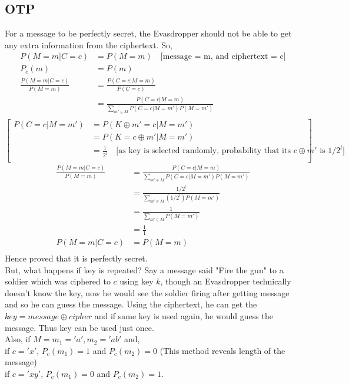 \documentclass[english, 11pt]{article}
\begin{document}
\subsection*{OTP}
For a message to be perfectly secret, the Evasdropper should not be able to get any extra information from the ciphertext. So, \\
\begin{align*}
  P(M=m|C=c) &= P(M=m) \quad \text{[message = m, and ciphertext = c]} \\
  P_c(m) &= P(m) \\
  \frac{P(M=m|C=c)}{P(M=m)} &= \frac{P(C=c|M=m)}{P(C=c)} \\
  &= \frac{P(C=c|M=m)}{\sum_{m' \in M} P(C=c|M=m')P(M=m')} \\
\end{align*}
\[
\left[
\begin{aligned}
  P(C=c|M=m') &= P(K \oplus m' = c | M = m') \\
  &= P(K = c \oplus m'  | M = m') \\
  &= \frac{1}{2^l} \quad \text{[as key is selected randomly, probability that its $c \oplus m'$ is $1/2^l$]} \\
\end{aligned}
\right]
\]
\begin{align*}
  \frac{P(M=m|C=c)}{P(M=m)} &= \frac{P(C=c|M=m)}{\sum_{m' \in M} P(C=c|M=m')P(M=m')} \\
  &= \frac{1/2^l}{\sum_{m' \in M} (1/2^l)P(M=m')} \\
  &= \frac{1}{\sum_{m' \in M} P(M=m')} \\
  &= \frac{1}{1} \\
  P(M=m|C=c) &= P(M=m) \\
\end{align*}
Hence proved that it is perfectly secret. \\
But, what happens if key is repeated? Say a message said "Fire the gun" to a soldier which was ciphered to $c$ using key $k$, though an Evasdropper technically doesn't know the key, now he would see the soldier firing after getting message and so he can guess the message.
Using the ciphertext, he can get the $key = message \oplus cipher$ and if same key is used again, he would guess the message. Thus key can be used just once.\\
Also, if $M = {m_1='a',m_2='ab'}$ and,\\
if $c='x'$, $P_c(m_1) = 1$ and $P_c(m_2) = 0$ (This method reveals length of the message) \\
if $c='xy'$, $P_c(m_1) = 0$ and $P_c(m_2) = 1$.
\end{document}
